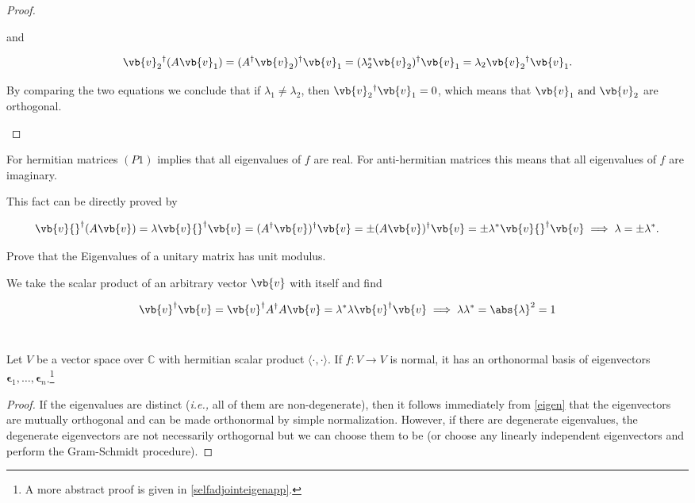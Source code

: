 \documentclass[a4paper,12pt]{report}
\begin{document}
\begin{proof}
\begin{enumerate}[label=(\(P\)\arabic*)]
    and

    \begin{equation}
        \vb{v} _{2} {}^{\dagger} (A\vb{v} _{1}) = (A^{\dagger} \vb{v} _{2}) {}^{\dagger}  \vb{v} _{1} = (\lambda _{2}^* \vb{v} _{2} ){}^{\dagger} \vb{v} _{1} = \lambda _{2}\vb{v} _{2} {}^{\dagger}   \vb{v} _{1}. 
    \end{equation}

    By comparing the two equations we conclude that if \(\lambda _{1} \neq \lambda _{2}  \), then \(\vb{v} _{2}{}^{\dagger} \vb{v} _{1} = 0 \), which means that \(\vb{v} _{1} \text { and } \vb{v} _{2}\) are orthogonal.    
\end{enumerate}

\end{proof}

For hermitian matrices \((P1)\) implies that all eigenvalues of \(f\) are real. For anti-hermitian matrices this means that all eigenvalues of \(f\) are imaginary.

This fact can be directly proved by 

\begin{equation}
    \vb{v} {}^{\dagger} (A\vb{v} ) = \lambda \vb{v} {}^{\dagger} \vb{v} = (A^{\dagger} \vb{v} ){}^{\dagger} \vb{v} = \pm (A\vb{v} ){}^{\dagger} \vb{v} = \pm \lambda ^* \vb{v} {}^{\dagger} \vb{v} \implies \lambda = \pm \lambda ^*.
\end{equation}

{Prove that the Eigenvalues of a unitary matrix has unit modulus.}
{We take the scalar product of an arbitrary vector \(\vb{v} \) with itself and find  
    
\begin{equation}
    \vb{v}^{\dagger}\vb{v}  = {\vb{v} }^{\dagger}A^{\dagger} A \vb{v} = \lambda ^*\lambda \vb{v}^{\dagger} \vb{v} \implies \lambda \lambda ^* = \abs{\lambda }^2= 1 \label{lam1} 
\end{equation}
~} 

\begin{theorem} \label{selfadjointeigen} 
    Let $V$ be a vector space over $\mathbb{C}$ with hermitian scalar product $\langle \cdot, \cdot \rangle$. If $f : V \to V$ is normal, it has an orthonormal basis of eigenvectors  \(\boldsymbol{\epsilon }_{1}, \ldots , \boldsymbol{\epsilon }_{n} \).\footnote{A more abstract proof is given in \cref{selfadjointeigenapp}.} 
\end{theorem}

\begin{proof}
If the eigenvalues are distinct (\textit{i.e.,} all of them are non-degenerate), then it follows immediately from \cref{eigen} that the eigenvectors are mutually orthogonal and can be made orthonormal by simple normalization. However, if there are degenerate eigenvalues, the degenerate eigenvectors are not necessarily orthogornal but we can choose them to be (or choose any linearly independent eigenvectors and perform the Gram-Schmidt procedure).
\end{proof}
\end{document}
